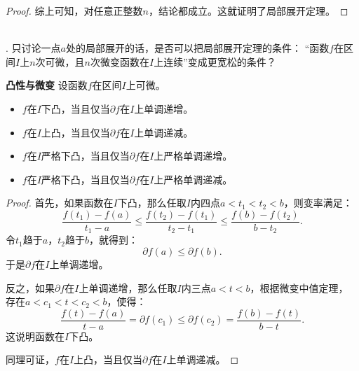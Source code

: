 \documentclass[12pt,UTF8]{ctexbook}
\begin{document}
\begin{appendix}
\begin{proof}
    综上可知，对任意正整数$n$，结论都成立。这就证明了局部展开定理。
\end{proof}

\begin{sk}
    \mbox{} \\
    . 只讨论一点$a$处的局部展开的话，是否可以把局部展开定理的条件：
    “函数$f$在区间$I$上$n$次可微，且$n$次微变函数在$I$上连续”变成更宽松的条件？\\
\end{sk}

\begin{tm}{\textbf{凸性与微变}}
    设函数$f$在区间$I$上可微。
    \begin{itemize}
        \item $f$在$I$下凸，当且仅当$\partial f$在$I$上单调递增。
        \item $f$在$I$上凸，当且仅当$\partial f$在$I$上单调递减。
        \item $f$在$I$严格下凸，当且仅当$\partial f$在$I$上严格单调递增。
        \item $f$在$I$严格下凸，当且仅当$\partial f$在$I$上严格单调递减。
    \end{itemize}
\end{tm}

\begin{proof}
    首先，如果函数在$I$下凸，那么任取$I$内四点$a < t_1 < t_2 < b$，则变率满足：
    $$ \frac{f(t_1) - f(a)}{t_1 - a} \leqslant \frac{f(t_2) - f(t_1)}{t_2 - t_1} \leqslant \frac{f(b) - f(t_2)}{b - t_2}. $$
    令$t_1$趋于$a$，$t_2$趋于$b$，就得到：
    $$ \partial f(a) \leqslant \partial f(b).$$
    于是$\partial f$在$I$上单调递增。

    反之，如果$\partial f$在$I$上单调递增，那么任取$I$内三点$a < t < b$，根据微变中值定理，
    存在$a < c_1 < t < c_2 < b$，使得：
    $$ \frac{f(t) - f(a)}{t - a} = \partial f(c_1) \leqslant  \partial f(c_2) = \frac{f(b) - f(t)}{b - t}. $$
    这说明函数在$I$下凸。

    同理可证，$f$在$I$上凸，当且仅当$\partial f$在$I$上单调递减。


\end{proof}
\end{appendix}
\end{document}
